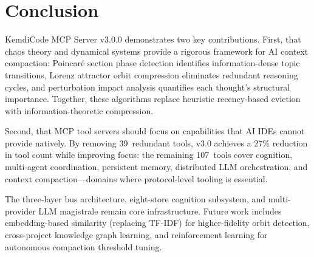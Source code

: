 \documentclass[journal,10pt]{IEEEtran}
\begin{document}
\section{Conclusion}
\label{sec:conclusion}

KemdiCode MCP Server v3.0.0 demonstrates two key contributions. First, that chaos theory and dynamical systems provide a rigorous framework for AI context compaction: Poincar\'{e} section phase detection identifies information-dense topic transitions, Lorenz attractor orbit compression eliminates redundant reasoning cycles, and perturbation impact analysis quantifies each thought's structural importance. Together, these algorithms replace heuristic recency-based eviction with information-theoretic compression.

Second, that MCP tool servers should focus on capabilities that AI IDEs cannot provide natively. By removing 39~redundant tools, v3.0 achieves a 27\% reduction in tool count while improving focus: the remaining 107~tools cover cognition, multi-agent coordination, persistent memory, distributed LLM orchestration, and context compaction---domains where protocol-level tooling is essential.

The three-layer bus architecture, eight-store cognition subsystem, and multi-provider LLM magistrale remain core infrastructure. Future work includes embedding-based similarity (replacing TF-IDF) for higher-fidelity orbit detection, cross-project knowledge graph learning, and reinforcement learning for autonomous compaction threshold tuning.
\end{document}
